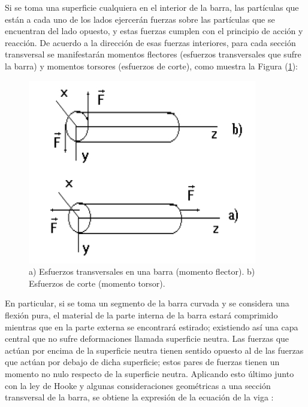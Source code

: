 \documentclass[twoside,twocolumn,a4paper]{article}
\begin{document}
Si se toma una superficie cualquiera en el interior de la barra, las part\'iculas que est\'an a cada uno de los lados ejercer\'an fuerzas sobre las part\'iculas que se encuentran del lado opuesto, y estas fuerzas cumplen con el principio de acci\'on y reacci\'on. De acuerdo a la direcci\'on de esas fuerzas interiores, para cada secci\'on transversal se manifestar\'an momentos flectores (esfuerzos transversales que sufre la barra) y momentos torsores (esfuerzos de corte), como muestra la Figura (\ref{fig:momentos}):

\begin{figure}[H]
\includegraphics[width=\linewidth]{momentos.jpg}
\caption{a) Esfuerzos transversales en una barra (momento flector). b) Esfuerzos de corte (momento torsor).}
\label{fig:momentos}
\end{figure}

En particular, si se toma un segmento de la barra curvada y se considera una flexi\'on pura, el material de la parte interna de la barra estar\'a comprimido mientras que en la parte externa se encontrar\'a estirado; existiendo as\'i una capa central que no sufre deformaciones llamada superficie neutra. Las fuerzas que act\'uan por encima de la superficie neutra tienen sentido opuesto al de las fuerzas que act\'uan por debajo de dicha superficie; estos pares de fuerzas tienen un momento no nulo respecto de la superficie neutra.	Aplicando esto \'ultimo junto con la ley de Hooke y algunas consideraciones geom\'etricas a una secci\'on transversal de la barra, se obtiene la expresi\'on de la ecuaci\'on de la viga \cite{eq:vigas}:
\end{document}
